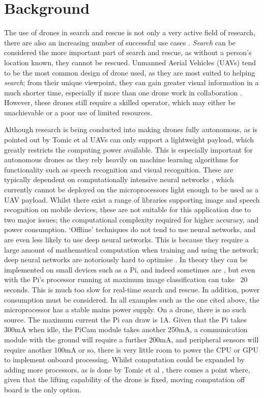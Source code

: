 \documentclass{article}
\begin{document}
\section{Background}
The use of drones in search and rescue is not only a very active field of research, there are also an increasing number of successful use cases \cite{UAVUseCase}. \emph{Search} can be considered the more important part of search and rescue, as without a person's location known, they cannot be rescued. Unmanned Aerial Vehicles (UAVs) tend to be the most common design of drone used, as they are most suited to helping \emph{search}; from their unique viewpoint, they can gain greater visual information in a much shorter time, especially if more than one drone work in collaboration \cite{UAV}. However, these drones still require a skilled operator, which may either be unachievable or a poor use of limited resources.

\vspace{\baselineskip} \noindent
Although research is being conducted into making drones fully autonomous, as is pointed out by Tomic et al  \cite{Autonomous} UAVs can only support a lightweight payload, which greatly restricts the computing power available. This is especially important for autonomous drones as they rely heavily on machine learning algorithms for functionality such as speech recognition and visual recognition. These are typically dependent on computationally intensive neural networks \cite{Neural}, which currently cannot be deployed on the microprocessors light enough to be used as a UAV payload. Whilst there exist a range of libraries supporting image and speech recognition on mobile devices, these are not suitable for this application due to two major issues; the computational complexity required for higher accuracy, and power consumption. `Offline' techniques do not tend to use neural networks, and are even less likely to use deep neural networks. This is because they require a large amount of mathematical computation when training and using the network; deep neural networks are notoriously hard to optimise \cite{DeepAI}. In theory they can be implemented on small devices such as a Pi, and indeed sometimes are \cite{DeepPi}, but even with the Pi's processor running at maximum image classification can take ~20 seconds. This is much too slow for real-time search and rescue. In addition, power consumption must be considered. In all examples such as the one cited above, the microprocessor has a stable mains power supply. On a drone, there is no such source. The maximum current the Pi can draw is 1A. Given that the Pi takes 300mA when idle, the PiCam module takes another 250mA, a communication module with the ground will require a further 200mA, and peripheral sensors will require another 100mA or so, there is very little room to power the CPU or GPU to implement onboard processing. Whilst computation could be expanded by adding more processors, as is done by Tomic et al \cite{Autonomous}, there comes a point where, given that the lifting capability of the drone is fixed, moving computation off board is the only option.
\end{document}
